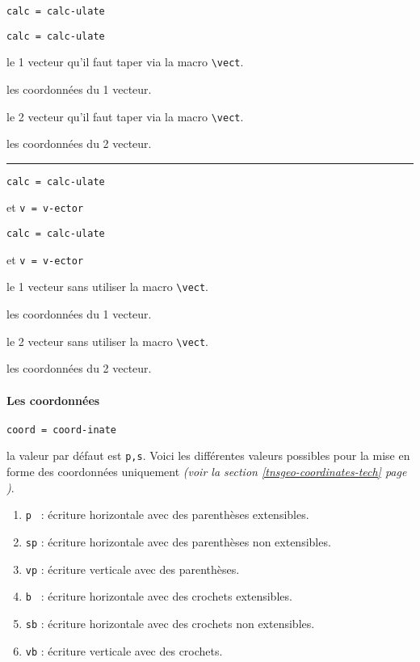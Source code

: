 \documentclass[12pt,a4paper]{article}
\newcommand\env[1]{\texttt{#1}}
\newcommand\macro[1]{\env{\textbackslash{}#1}}
\theoremstyle{definition}
\newcommand\separation{
	\medskip
	\hfill\rule{0.5\textwidth}{0.75pt}\hfill
	\medskip
}
\newcommand\mwhyprefix[2]{%
	\texttt{#1 = #1-#2}%
}
\begin{document}
  \hfill \mwhyprefix{calc}{ulate}

 \hfill \mwhyprefix{calc}{ulate}

 le 1\ier{} vecteur qu'il faut taper via la macro \macro{vect}.

 les coordonnées du 1\ier{} vecteur.

 le 2\ieme{} vecteur qu'il faut taper via la macro \macro{vect}.

 les coordonnées du 2\ieme{} vecteur.


\separation


  \hfill \mwhyprefix{calc}{ulate}
                                     et \mwhyprefix{v}{ector}

 \hfill \mwhyprefix{calc}{ulate}
                                     et \mwhyprefix{v}{ector}

 le 1\ier{} vecteur sans utiliser la macro \macro{vect}.

 les coordonnées du 1\ier{} vecteur.

 le 2\ieme{} vecteur sans utiliser la macro \macro{vect}.

 les coordonnées du 2\ieme{} vecteur.



\paragraph{Les coordonnées}



  \hfill \mwhyprefix{coord}{inate}

\IDoption{} la valeur par défaut est \verb+p,s+. 
            Voici les différentes valeurs possibles pour la mise en forme des coordonnées uniquement \emph{(voir la section \ref{tnsgeo-coordinates-tech} page \pageref{tnsgeo-coordinates-tech})}.
\begin{enumerate}
	\item \verb+p + : écriture horizontale avec des parenthèses extensibles.

	\item \verb+sp+ : écriture horizontale avec des parenthèses non extensibles.

	\item \verb+vp+ : écriture verticale avec des parenthèses.

	\medskip
	
	\item \verb+b + : écriture horizontale avec des crochets extensibles.

	\item \verb+sb+ : écriture horizontale avec des crochets non extensibles.

	\item \verb+vb+ : écriture verticale avec des crochets.
\end{enumerate}
\end{document}
